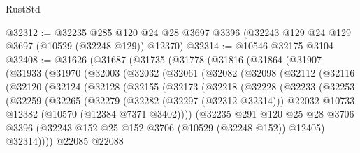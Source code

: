 \begin{lexlean}{RustStd}
\begin{coremodule}
@32312 := @32235
    @285
    @120
    @24
    @28
    @3697
    @3396
    (@32243 @129 @24 @129 @3697 (@10529 (@32248 @129)) @12370)
@32314 := @10546 @32175 @3104
@32408 := @31626
    (@31687
      (@31735
        (@31778
          (@31816
            (@31864
              (@31907
                (@31933
                  (@31970
                    (@32003
                      (@32032
                        (@32061
                          (@32082
                            (@32098
                              (@32112
                                (@32116
                                  (@32120
                                    (@32124
                                      (@32128
                                        (@32155
                                          (@32173
                                            (@32218
                                              (@32228
                                                (@32233
                                                  (@32253
                                                    (@32259
                                                      (@32265
                                                        (@32279
                                                          (@32282 (@32297 (@32312 @32314)))
                                                          @22032
                                                          @10733
                                                          @12382
                                                          (@10570 (@12384 @7371 @3402))))
                                                      (@32235
                                                        @291
                                                        @120
                                                        @25
                                                        @28
                                                        @3706
                                                        @3396
                                                        (@32243
                                                          @152
                                                          @25
                                                          @152
                                                          @3706
                                                          (@10529 (@32248 @152))
                                                          @12405)
                                                        @32314))))
                                                @22085
                                                @22088

\end{coremodule}
\end{lexlean}
